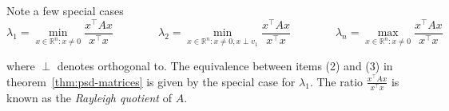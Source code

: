 Note a few special cases
\begin{equation*}
\lambda_1 = \min_{x \in \mathbb{R}^n : x \neq 0} \frac{x^\top Ax}{x^\top x}
\qquad\qquad
\lambda_2 = \min_{x \in \mathbb{R}^n : x \neq 0, x \perp v_1} \frac{x^\top Ax}{x^\top x}
\qquad\qquad
\lambda_n = \max_{x \in \mathbb{R}^n : x \neq 0} \frac{x^\top Ax}{x^\top x}
\end{equation*}

where $\perp$ denotes orthogonal to. The equivalence between items (2) and (3) in theorem~\ref{thm:psd-matrices} is given by the special case for $\lambda_1$. The ratio $\frac{x^\top Ax}{x^\top x}$ is known as the \emph{Rayleigh quotient} of $A$.